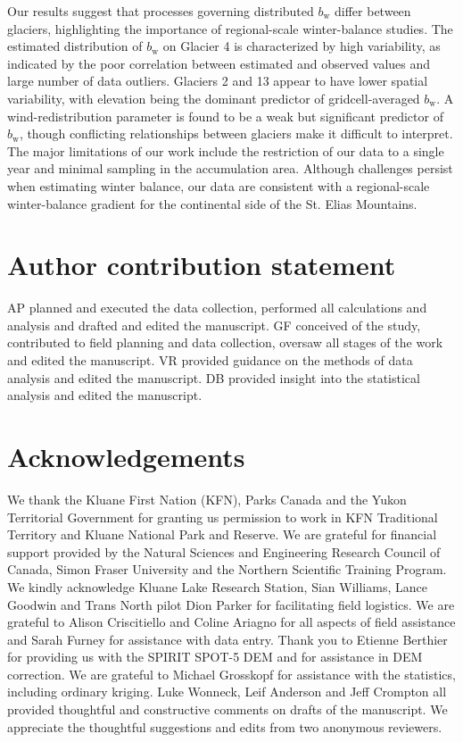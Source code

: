 \documentclass[review,oneside, letterpaper]{igs}
\begin{document}
Our results suggest that processes governing distributed $b_\mathrm{w}$ differ between glaciers, highlighting the importance of regional-scale winter-balance studies. The estimated distribution of $b_\mathrm{w}$ on Glacier 4 is characterized by high variability, as indicated by the poor correlation between estimated and observed values and large number of data outliers. Glaciers 2 and 13 appear to have lower spatial variability, with elevation being the dominant predictor of gridcell-averaged $b_\mathrm{w}$. A wind-redistribution parameter is found to be a weak but significant predictor of $b_\mathrm{w}$, though conflicting relationships between glaciers make it difficult to interpret. The major limitations of our work include the restriction of our data to a single year and minimal sampling in the accumulation area. Although challenges persist when estimating winter balance, our data are consistent with a regional-scale winter-balance gradient for the continental side of the St. Elias Mountains. 

\section{Author contribution statement}

AP planned and executed the data collection, performed all calculations and analysis and drafted and edited the manuscript. GF conceived of the study, contributed to field planning and data collection, oversaw all stages of the work and edited the manuscript. VR provided guidance on the methods of data analysis and edited the manuscript. DB provided insight into the statistical analysis and edited the manuscript.

\section{Acknowledgements}

We thank the Kluane First Nation (KFN), Parks Canada and the Yukon Territorial Government for granting us permission to work in KFN Traditional Territory and Kluane National Park and Reserve. We are grateful for financial support provided by the Natural Sciences and Engineering Research Council of  Canada, Simon Fraser University and the Northern Scientific  Training  Program. We kindly acknowledge Kluane Lake Research Station, Sian Williams, Lance Goodwin and Trans North pilot Dion Parker for facilitating field logistics. We are grateful to Alison Criscitiello and Coline Ariagno for all aspects of field assistance and Sarah Furney for assistance with data entry. Thank you to Etienne Berthier for providing us with the SPIRIT SPOT-5 DEM and for assistance in DEM correction. We are grateful to Michael Grosskopf for assistance with the statistics, including ordinary kriging. Luke Wonneck, Leif Anderson and Jeff Crompton all provided thoughtful and constructive comments on drafts of the manuscript. We appreciate the thoughtful
suggestions and edits from two anonymous reviewers.
\end{document}

